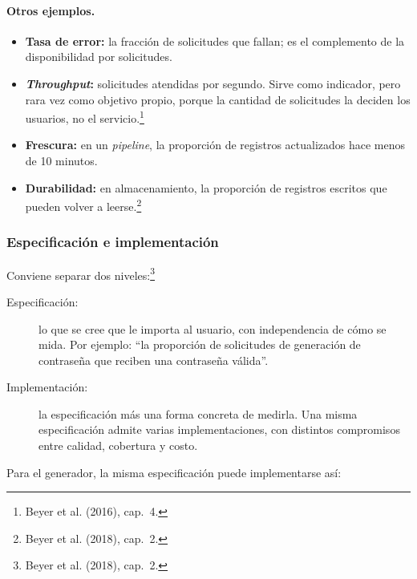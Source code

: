 \documentclass[variant=apuntes,cover=institutional,mode=screen]{ua-engineering-v6-article}
\begin{document}
\paragraph{Otros ejemplos.}
\begin{itemize}
\item \textbf{Tasa de error:} la fracción de solicitudes que fallan; es el complemento de la disponibilidad por solicitudes.
\item \textbf{\emph{Throughput}:} solicitudes atendidas por segundo. Sirve como indicador, pero rara vez como objetivo propio, porque la cantidad de solicitudes la deciden los usuarios, no el servicio.\footnote{Beyer et al. (2016), cap.~4.}
\item \textbf{Frescura:} en un \emph{pipeline}, la proporción de registros actualizados hace menos de 10 minutos.
\item \textbf{Durabilidad:} en almacenamiento, la proporción de registros escritos que pueden volver a leerse.\footnote{Beyer et al. (2018), cap.~2.}
\end{itemize}

\subsubsection{Especificación e implementación}

Conviene separar dos niveles:\footnote{Beyer et al. (2018), cap.~2.}
\begin{description}
\item[Especificación:] lo que se cree que le importa al usuario, con independencia de cómo se mida. Por ejemplo: ``la proporción de solicitudes de generación de contraseña que reciben una contraseña válida''.
\item[Implementación:] la especificación más una forma concreta de medirla. Una misma especificación admite varias implementaciones, con distintos compromisos entre calidad, cobertura y costo.
\end{description}

Para el generador, la misma especificación puede implementarse así:
\end{document}
